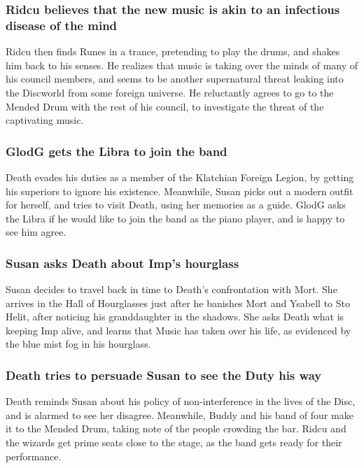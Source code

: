 \subsubsection{\Gls{Ridcu} believes that the new music is akin to an infectious disease of the mind}
\Gls{Ridcu} then finds \Gls{Runes} in a trance, pretending to play the drums, and shakes him back to
his senses. He realizes that music is taking over the minds of many of his council members, and
seems to be another supernatural threat leaking into the Discworld from some foreign universe. He
reluctantly agrees to go to the Mended Drum with the rest of his council, to investigate the
threat of the captivating music.

\subsubsection{\Gls{GlodG} gets the \Gls{Libra} to join the band}
\Gls{Death} evades his duties as a member of the Klatchian Foreign Legion, by getting his superiors
to ignore his existence. Meanwhile, \Gls{Susan} picks out a modern outfit for herself, and tries to
visit \Gls{Death}, using her memories as a guide. \Gls{GlodG} asks the \Gls{Libra} if he would like
to join the band as the piano player, and is happy to see him agree.

\subsubsection{\Gls{Susan} asks \Gls{Death} about \Gls{Imp}'s hourglass}
\Gls{Susan} decides to travel back in time to \Gls{Death}'s confrontation with \Gls{Mort}. She
arrives in the Hall of Hourglasses just after he banishes \Gls{Mort} and \Gls{Ysabell} to Sto
Helit, after noticing his granddaughter in the shadows. She asks \Gls{Death} what is keeping
\Gls{Imp} alive, and learns that Music has taken over his life, as evidenced by the blue mist fog
in his hourglass.

\subsubsection{\Gls{Death} tries to persuade \Gls{Susan} to see the Duty his way}
\Gls{Death} reminds \Gls{Susan} about his policy of non-interference in the lives of the Disc, and
is alarmed to see her disagree. Meanwhile, \Gls{Buddy} and his band of four make it to the Mended
Drum, taking note of the people crowding the bar. \Gls{Ridcu} and the wizards get prime seats close
to the stage, as the band gets ready for their performance.

